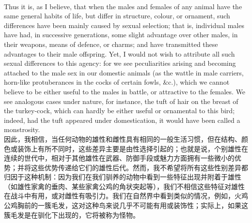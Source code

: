 \documentclass{article}
\begin{document}
\\
Thus it is, as I believe, that when the males and females of any animal have the same general habits of life, but differ in structure, colour, or ornament, such differences have been mainly caused by sexual selection; that is, individual males have had, in successive generations, some slight advantage over other males, in their weapons, means of defence, or charms; and have transmitted these advantages to their male offspring. Yet, I would not wish to attribute all such sexual differences to this agency: for we see peculiarities arising and becoming attached to the male sex in our domestic animals (as the wattle in male carriers, horn-like protuberances in the cocks of certain fowls, \&c.), which we cannot believe to be either useful to the males in battle, or attractive to the females. We see analogous cases under nature, for instance, the tuft of hair on the breast of the turkey-cock, which can hardly be either useful or ornamental to this bird; indeed, had the tuft appeared under domestication, it would have been called a monstrosity.\\
因此，我相信，当任何动物的雄性和雌性具有相同的一般生活习惯，但在结构、颜色或装饰上有所不同时，这些差异主要是由性选择引起的；也就是说，个别雄性在连续的世代中，相对于其他雄性在武器、防御手段或魅力方面拥有一些微小的优势；并将这些优势传递给它们的雄性后代。然而，我不希望将所有这些性别差异都归因于这种机制：因为我们在我们驯养的动物中看到一些特征出现并附着于雄性（如雄性家禽的垂肉、某些家禽公鸡的角状突起等），我们不相信这些特征对雄性在战斗中有用，或对雌性有吸引力。我们在自然界中看到类似的情况，例如，火鸡公鸡胸前的一簇毛发，这对这种鸟来说几乎不可能有用或装饰性；实际上，如果这簇毛发是在驯化下出现的，它将被称为怪物。\\
\end{document}
